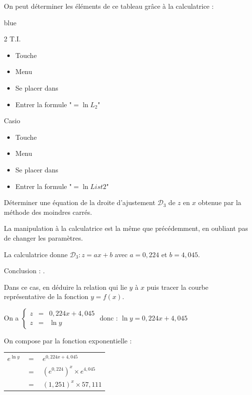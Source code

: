 \documentclass[french]{book}
\newcommand{\Syst}[2]{\left\{\begin{array}{lcccc} #1 \\ #2 \end{array}\right.}
\begin{document}
On peut déterminer les éléments de ce tableau grâce à la calculatrice :

\begin{color}{blue}
\begin{multicols}{2}
   T.I.
   \begin{itemize}
      \item[$\bullet$] Touche 
      \item[$\bullet$] Menu 
      \item[$\bullet$] Se placer dans 
      \item[$\bullet$] Entrer la formule "$=\ln L_2$"
   \end{itemize}
   Casio
   \begin{itemize}
      \item[$\bullet$] Touche 
      \item[$\bullet$] Menu 
      \item[$\bullet$] Se placer dans 
      \item[$\bullet$] Entrer la formule "$=\ln List2$"
   \end{itemize}
\end{multicols}
\end{color}




\begin{exemple}
   Déterminer une équation de la droite d'ajustement $\mathcal{D}_3$ de $z$ en $x$ obtenue par la méthode des moindres carrés.  
\end{exemple}

La manipulation à la calculatrice est la même que précédemment, en oubliant pas de changer les paramètres.

La calculatrice donne $\mathcal{D}_3:z=ax+b$ avec $a=0,224$ et $b=4,045$.

Conclusion : .



\begin{exemple}
   Dans ce cas, en déduire la relation qui lie $y$ à $x$ puis tracer la courbe représentative de la fonction $y=f(x)$.
\end{exemple}

On a $\Syst{z & = & 0,224x+4,045}{z & = & \ln y}$ \quad donc : \quad $\ln y=0,224x+4,045$

On compose par la fonction exponentielle :
\begin{tabular}[t]{ccl}
   $e^{\ln y} $& $=$ &$ e^{0,224x+4,045}$ \\
    &$ = $&$ (e^{0,224})^x\times e^{4,045}$ \\
    &$ =$ & $(1,251)^x\times 57,111$ \\
\end{tabular}
\end{document}
